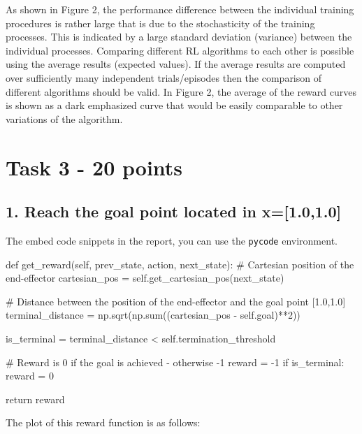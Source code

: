 \documentclass[12pt]{article}
\begin{document}
\noindent
As shown in Figure 2, the performance difference between the individual training procedures is rather large that is due to the stochasticity of the training processes. This is indicated by a large standard deviation (variance) between the individual processes. Comparing different RL algorithms to each other is possible using the average results (expected values). If the average results are computed over sufficiently many independent trials/episodes then the comparison of different algorithms should be valid. In Figure 2, the average of the reward curves is shown as a dark emphasized curve that would be easily comparable to other variations of the algorithm.  



\pagebreak
\section*{Task 3 - 20 points}

\subsection*{1. Reach the goal point located in x=[1.0,1.0]}
The embed code snippets in the report, you can use the \texttt{pycode} environment.

\begin{pycode}
def get_reward(self, prev_state, action, next_state):
        # Cartesian position of the end-effector
        cartesian_pos = self.get_cartesian_pos(next_state)
  
        # Distance between the position of the end-effector and the goal point [1.0,1.0]
        terminal_distance = np.sqrt(np.sum((cartesian_pos - self.goal)**2))

        is_terminal = terminal_distance < self.termination_threshold

        # Reward is 0 if the goal is achieved - otherwise -1
        reward = -1
        if is_terminal: 
            reward = 0

        return reward
\end{pycode}

\noindent  
The plot of this reward function is as follows: 
\end{document}
